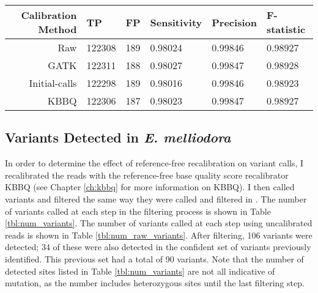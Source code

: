 \begin{table}
\centering
\begin{tabular}{r l l l l l}
\toprule
Calibration Method & TP & FP & Sensitivity & Precision & F-statistic \\
\midrule
Raw & 122308 & 189 & 0.98024 & 0.99846 & 0.98927\\ 
GATK & 122311 & 188 & 0.98027 & 0.99847 & 0.98928\\ 
Initial-calls & 122298 & 189 & 0.98016 & 0.99846 & 0.98923\\ 
KBBQ & 122306 & 187 & 0.98023 & 0.99847 & 0.98927\\ 
\bottomrule
\end{tabular}
\label{table:sim_summary}
\end{table}



\subsection{Variants Detected in \textit{E. melliodora}}

In order to determine the effect of reference-free recalibration on variant calls, I recalibrated the reads with the reference-free base quality score recalibrator KBBQ (see Chapter \ref{ch:kbbq} for more information on KBBQ). I then called variants and filtered the same way they were called and filtered in \cite{orr_phylogenomic_2020}. The number of variants called at each step in the filtering process is shown in Table \ref{tbl:num_variants}. The number of variants called at each step using uncalibrated reads is shown in Table \ref{tbl:num_raw_variants}. After filtering, 106 variants were detected; 34 of these were also detected in the confident set of variants previously identified. This previous set had a total of 90 variants. Note that the number of detected sites listed in Table \ref{tbl:num_variants} are not all indicative of mutation, as the number includes heterozygous sites until the last filtering step.

